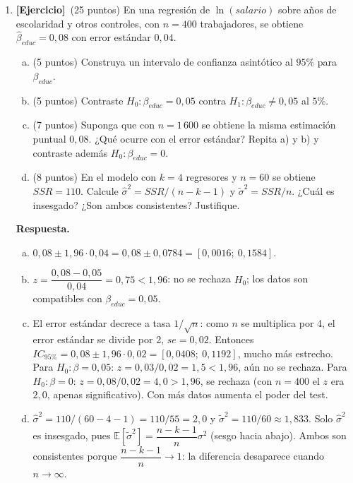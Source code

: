 \documentclass[12pt,letterpaper]{article}
\newcommand{\E}[1]{\mathbb{E}\left[#1\right]}
\newenvironment{resp}{\begingroup\color{blue}\par\noindent\textbf{Respuesta.}\ }{\par\endgroup}
\newcommand{\ejer}{\textbf{[Ejercicio]}}
\begin{document}
\begin{enumerate}[1.]
\item \ejer\ (25 puntos) En una regresión de $\ln(salario)$ sobre años de escolaridad y otros controles, con $n=400$ trabajadores, se obtiene $\hat\beta_{educ}=0{,}08$ con error estándar $0{,}04$.
\begin{enumerate}[a)]
\item (5 puntos) Construya un intervalo de confianza asintótico al $95\%$ para $\beta_{educ}$.
\item (5 puntos) Contraste $H_0:\beta_{educ}=0{,}05$ contra $H_1:\beta_{educ}\neq0{,}05$ al $5\%$.
\item (7 puntos) Suponga que con $n=1\,600$ se obtiene la misma estimación puntual $0{,}08$. ¿Qué ocurre con el error estándar? Repita a) y b) y contraste además $H_0:\beta_{educ}=0$.
\item (8 puntos) En el modelo con $k=4$ regresores y $n=60$ se obtiene $SSR=110$. Calcule $\hat\sigma^2=SSR/(n-k-1)$ y $\tilde\sigma^2=SSR/n$. ¿Cuál es insesgado? ¿Son ambos consistentes? Justifique.
\end{enumerate}

\begin{resp}
\begin{enumerate}[a)]
\item $0{,}08\pm1{,}96\cdot0{,}04=0{,}08\pm0{,}0784=[0{,}0016;\ 0{,}1584]$.
\item $z=\dfrac{0{,}08-0{,}05}{0{,}04}=0{,}75<1{,}96$: no se rechaza $H_0$; los datos son compatibles con $\beta_{educ}=0{,}05$.
\item El error estándar decrece a tasa $1/\sqrt n$: como $n$ se multiplica por 4, el error estándar se divide por 2, $se=0{,}02$. Entonces
$IC_{95\%}=0{,}08\pm1{,}96\cdot0{,}02=[0{,}0408;\ 0{,}1192]$, mucho más estrecho. Para $H_0:\beta=0{,}05$: $z=0{,}03/0{,}02=1{,}5<1{,}96$, aún no se rechaza. Para $H_0:\beta=0$: $z=0{,}08/0{,}02=4{,}0>1{,}96$, se rechaza (con $n=400$ el $z$ era $2{,}0$, apenas significativo). Con más datos aumenta el poder del test.
\item $\hat\sigma^2=110/(60-4-1)=110/55=2{,}0$ y $\tilde\sigma^2=110/60\approx1{,}833$. Solo $\hat\sigma^2$ es insesgado, pues $\E{\tilde\sigma^2}=\dfrac{n-k-1}{n}\sigma^2$ (sesgo hacia abajo). Ambos son consistentes porque $\dfrac{n-k-1}{n}\to1$: la diferencia desaparece cuando $n\to\infty$.
\end{enumerate}
\end{resp}
\end{enumerate}
\end{document}
